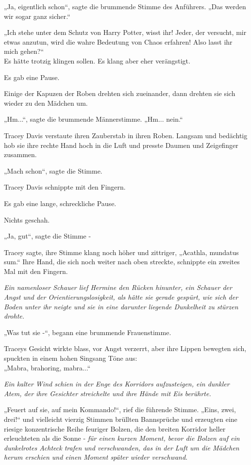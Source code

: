 {„Ja, eigentlich schon“, sagte die brummende Stimme des Anführers. „Das werden wir sogar ganz sicher.“

„Ich stehe unter dem Schutz von Harry Potter, wisst ihr! Jeder, der versucht, mir etwas anzutun, wird die wahre Bedeutung von Chaos erfahren! Also lasst ihr mich gehen?“\\ Es hätte trotzig klingen sollen. Es klang aber eher verängstigt.

Es gab eine Pause.

Einige der Kapuzen der Roben drehten sich zueinander, dann drehten sie sich wieder zu den Mädchen um.

„Hm...“, sagte die brummende Männerstimme. „Hm... nein.“

Tracey Davis verstaute ihren Zauberstab in ihren Roben. Langsam und bedächtig hob sie ihre rechte Hand hoch in die Luft und presste Daumen und Zeigefinger zusammen.

„Mach schon“, sagte die Stimme.

Tracey Davis schnippte mit den Fingern.

Es gab eine lange, schreckliche Pause.

Nichts geschah.

„Ja, gut“, sagte die Stimme -

Tracey sagte, ihre Stimme klang noch höher und zittriger, „Acathla, mundatus sum.“ Ihre Hand, die sich noch weiter nach oben streckte, schnippte ein zweites Mal mit den Fingern.

\emph{Ein namenloser Schauer lief Hermine den Rücken hinunter, ein Schauer der Angst und der Orientierungslosigkeit, als hätte sie gerade gespürt, wie sich der Boden unter ihr neigte und sie in eine darunter liegende Dunkelheit zu stürzen drohte.}

„Was tut sie -“, begann eine brummende Frauenstimme.

Traceys Gesicht wirkte blass, vor Angst verzerrt, aber ihre Lippen bewegten sich, spuckten in einem hohen Singsang Töne aus:\\ „Mabra, brahoring, mabra...“

\emph{Ein kalter Wind schien in der Enge des Korridors aufzusteigen, ein dunkler Atem, der ihre Gesichter streichelte und ihre Hände mit Eis berührte.}

„Feuert auf sie, auf mein Kommando!“, rief die führende Stimme. „Eins, zwei, drei!“ und vielleicht vierzig Stimmen brüllten Bannsprüche und erzeugten eine riesige konzentrische Reihe feuriger Bolzen, die den breiten Korridor heller erleuchteten als die Sonne - \emph{für einen kurzen Moment, bevor die Bolzen auf ein dunkelrotes Achteck trafen und verschwanden, das in der Luft um die Mädchen herum erschien und einen Moment später wieder verschwand}.

}
